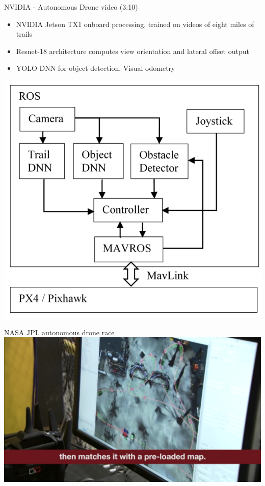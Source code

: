\documentclass[aspectratio=169]{beamer}
\begin{document}
\begin{frame}{NVIDIA - Autonomous Drone video (3:10)}
	\begin{itemize}
		\item NVIDIA Jetson TX1 onboard processing, trained on videos of eight miles of trails
		\item Resnet-18 architecture computes view orientation and lateral offset output
		\item YOLO DNN for object detection, Visual odometry
	\end{itemize}
	\centering
	\includegraphics[width=.4\textwidth]{images/nvidia_controller.png}
	
	\tiny{\color{gray}{https://arxiv.org/pdf/1705.02550.pdf}}
	
\end{frame}

\begin{frame}{NASA JPL autonomous drone race}
        	\centering
            \href{run:./videos/NasaAutoDrone.mp4?autostart}
            {\includegraphics[width=\linewidth]{images/nasa.png}}
\end{frame}
\end{document}
